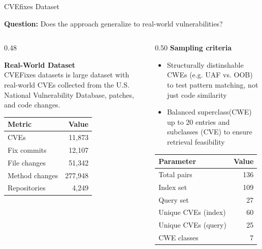 \documentclass[aspectratio=169,10pt]{beamer}
\begin{document}
\begin{frame}{CVEfixes Dataset }
  
  \textbf{Question:} Does the approach generalize to real-world vulnerabilities?
  \vspace{0.3cm}
  
\begin{columns}[T]
\begin{column}{0.48\textwidth}

  \textbf{Real-World Dataset}\\[3pt]
  {\small CVEFixes \cite{bhandari2021cvefixes} datasets is large dataset with real-world CVEs collected from the U.S. National Vulnerability Database, patches, and code changes.\\}
  
  \vspace{0.5em}
  \begin{center}
    
  \scriptsize
  \begin{tabular}{lr}
    \toprule
    \textbf{Metric} & \textbf{Value} \\
    \midrule
    CVEs & 11,873 \\
    Fix commits & 12,107 \\
    File changes & 51,342 \\
    Method changes & 277,948 \\
    Repositories & 4,249 \\
    \bottomrule
  \end{tabular}
  \end{center}
\end{column}
\begin{column}{0.50\textwidth}
    {\small\textbf{Sampling criteria}}\\[3pt]
  {\scriptsize
  \begin{itemize}\itemsep1pt
    \item Structurally distinshable CWEs (e.g. UAF vs. OOB) to test pattern matching, not just code similarity
    \item Balanced superclass(CWE) up to 20 entries and subclasses (CVE) to ensure retrieval feasibility
  \end{itemize}}
      \vspace{0.5em}
    \begin{center}

  {\scriptsize
  \renewcommand{\arraystretch}{1.2}
  \begin{tabular}{lr}
    \toprule
    \textbf{Parameter} & \textbf{Value} \\
    \midrule
    Total pairs & 136 \\
    Index set & 109 \\
    Query set & 27 \\
    Unique CVEs (index) & 60 \\
    Unique CVEs (query) & 25 \\
    CWE classes & 7 \\
    \bottomrule
  \end{tabular}}


\end{center}
\end{column}
\end{columns}
\end{frame}
\end{document}
